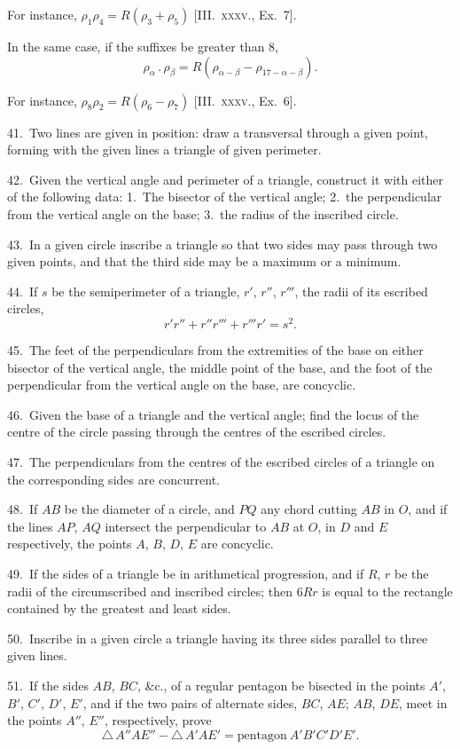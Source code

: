 \documentclass[oneside]{book}
\begin{document}
\begin{footnotesize}
For instance, \quad $\rho_1\rho_4 = R(\rho_3 + \rho_5)$ [\textsc{III\@.~xxxv.}, Ex.~7].

In the same case, if the suffixes be greater than 8,
\[
\rho_\alpha \,.\, \rho_\beta = R(\rho_{\alpha - \beta} - \rho_{17 - \alpha - \beta}).
\]

For instance, \quad $\rho_8 \rho_2 = R(\rho_6 - \rho_7)$ [\textsc{III\@.~xxxv.}, Ex.~6].

41.~Two lines are given in position: draw a transversal through
a given point, forming with the given lines a triangle of given
perimeter.

42.~Given the vertical angle and perimeter of a triangle, construct
it with either of the following data: 1.~The bisector of
the vertical angle; 2.~the perpendicular from the vertical angle
on the base; 3.~the radius of the inscribed circle.

43.~In a given circle inscribe a triangle so that two sides may
pass through two given points, and that the third side may be a
maximum or a minimum.

44.~If $s$ be the semiperimeter of a triangle, $r'$, $r''$, $r'''$, the
radii of its escribed circles,
\[
r'r'' + r''r''' + r'''r' = s^2.
\]

45.~The feet of the perpendiculars from the extremities of the
base on either bisector of the vertical angle, the middle point of
the base, and the foot of the perpendicular from the vertical
angle on the base, are concyclic.

46.~Given the base of a triangle and the vertical angle; find
the locus of the centre of the circle passing through the centres
of the escribed circles.

47.~The perpendiculars from the centres of the escribed circles
of a triangle on the corresponding sides are concurrent.

48.~If $AB$ be the diameter of a circle, and $PQ$ any chord cutting
$AB$ in $O$, and if the lines $AP$, $AQ$ intersect the perpendicular
to $AB$ at $O$, in $D$ and $E$ respectively, the points $A$, $B$, $D$, $E$ are
concyclic.


49.~If the sides of a triangle be in arithmetical progression,
and if $R$, $r$ be the radii of the circumscribed and inscribed circles;
then $6Rr$ is equal to the rectangle contained by the greatest and
least sides.

50.~Inscribe in a given circle a triangle having its three sides
parallel to three given lines.

51.~If the sides $AB$, $BC$, \&c., of a regular pentagon be bisected
in the points $A'$, $B'$, $C'$, $D'$, $E'$, and if the two pairs of alternate
sides, $BC$, $AE$; $AB$, $DE$, meet in the points $A''$, $E''$, respectively,
prove
\[
\triangle\, A''AE'' - \triangle\, A'AE' = \text{pentagon}\ A'B'C'D'E'.
\]


\end{footnotesize}
\end{document}
